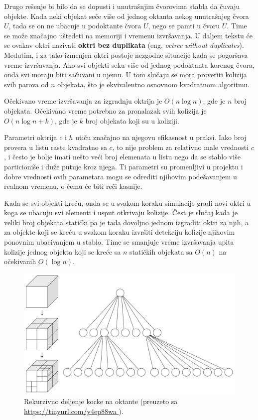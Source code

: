 \documentclass[12pt,oneside]{memoir}
\begin{document}
Drugo rešenje bi bilo da se dopusti i unutrašnjim čvorovima stabla da čuvaju objekte.
Kada neki objekat seče više od jednog oktanta nekog unutrašnjeg čvora $U$, tada se on ne ubacuje 
u podoktante čvora $U$, nego se pamti u čvoru $U$. Time se može značajno uštedeti na memoriji i vremenu izvršavanja.
U daljem tekstu će se ovakav oktri nazivati \textbf{oktri bez duplikata} (eng. {\em octree without duplicates}).
Međutim, i za tako izmenjen oktri postoje nezgodne situacije kada se pogoršava vreme izvršavanja.
Ako svi objekti seku više od jednog podoktanta korenog čvora, onda svi moraju biti sačuvani u njemu. 
U tom slučaju se mora proveriti kolizija svih parova od $n$ objekata, što je ekvivalentno osnovnom kvadratnom algoritmu.

Očekivano vreme izvršavanja za izgradnju oktrija je $O(n \log n)$, gde je $n$ broj objekata.
Očekivano vreme potrebno za pronalazak svih kolizija je $O(n \log n + k)$, gde je $k$ broj objekata koji su u koliziji.

Parametri oktrija $c$ i $h$  utiču značajno na njegovu efikasnost u praksi. 
Iako broj provera u listu raste kvadratno sa $c$, to nije problem za relativno male vrednosti $c$, i često je bolje 
imati nešto veći broj elemenata u listu nego da se stablo više particioniše i duže putuje kroz njega.
Ti parametri su promenljivi u projektu i dobre vrednosti ovih parametara mogu se odrediti njihovim podešavanjem u realnom vremenu,
o čemu će biti reči kasnije.

Kada se svi objekti kreću, onda se u svakom koraku simulacije  gradi novi oktri u
koga se ubacuju svi elementi i usput otkrivaju kolizije.
Čest je slučaj kada je veliki broj objekata statički pa je tada dovoljno jednom izgraditi oktri za njih, a za objekte koji se kreću u svakom koraku 
izvršiti detekciju kolizije njihovim ponovnim ubacivanjem u stablo. Time se smanjuje vreme izvršavanja upita 
kolizije jednog objekta koji se kreće sa $n$ statičkih objekata sa $O(n)$ na očekivanih $O(\log n)$.

\begin{figure}[h!]
	\centering
	\includegraphics[scale=0.22]{octree.png}
	\caption{Rekurzivno deljenje kocke na oktante (preuzeto sa \url{ https://tinyurl.com/y4ep88wa }).}
	
	\label{fig:oct}
\end{figure}
\end{document}
